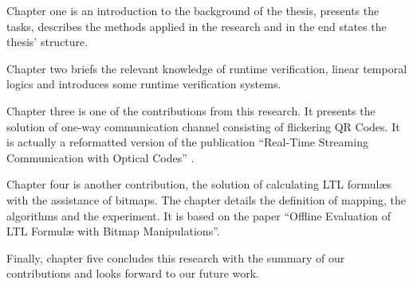 Chapter one is an introduction to the background of the thesis, presents the tasks, describes the methods applied in the research and in the end states the thesis' structure.

Chapter two briefs the relevant knowledge of runtime verification, linear temporal logics and introduces some runtime verification systems.

Chapter three is one of the contributions from this research. It presents the solution of one-way communication channel consisting of flickering QR Codes. It is actually a reformatted version of the publication ``Real-Time Streaming Communication with Optical Codes'' \citep{kxie7370891}.

Chapter four is another contribution, the solution of calculating LTL formul\ae{}s with the assistance of bitmaps. The chapter details the definition of mapping, the algorithms and the experiment. It is based on the paper ``Offline Evaluation of LTL Formul\ae{} with Bitmap Manipulations''.

Finally, chapter five concludes this research with the summary of our contributions and looks forward to our future work.